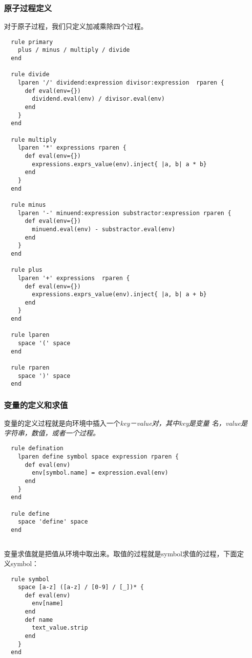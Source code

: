 \documentclass{article}
\begin{document}
\subsubsection{原子过程定义}
对于原子过程，我们只定义加减乘除四个过程。
\begin{verbatim}
  rule primary
    plus / minus / multiply / divide
  end

  rule divide
    lparen '/' dividend:expression divisor:expression  rparen {
      def eval(env={})
        dividend.eval(env) / divisor.eval(env)
      end
    }
  end

  rule multiply
    lparen '*' expressions rparen {
      def eval(env={})
        expressions.exprs_value(env).inject{ |a, b| a * b}
      end
    }
  end

  rule minus
    lparen '-' minuend:expression substractor:expression rparen {
      def eval(env={})
        minuend.eval(env) - substractor.eval(env)
      end
    }
  end

  rule plus
    lparen '+' expressions  rparen {
      def eval(env={})
        expressions.exprs_value(env).inject{ |a, b| a + b}
      end
    }
  end

  rule lparen
    space '(' space
  end

  rule rparen
    space ')' space
  end

\end{verbatim}

\subsubsection{变量的定义和求值}
变量的定义过程就是向环境中插入一个\em{key－value}对，其中key是变量
名，value是字符串，数值，或者一个过程。
\begin{verbatim}
  rule defination
    lparen define symbol space expression rparen {
      def eval(env)
        env[symbol.name] = expression.eval(env)
      end
    }
  end

  rule define
    space 'define' space
  end


\end{verbatim}
变量求值就是把值从环境中取出来。取值的过程就是symbol求值的过程，下面定
义symbol：
\begin{verbatim}
  rule symbol
    space [a-z] ([a-z] / [0-9] / [_])* {
      def eval(env)
        env[name]
      end
      def name
        text_value.strip
      end
    }
  end

\end{verbatim}
\end{document}
